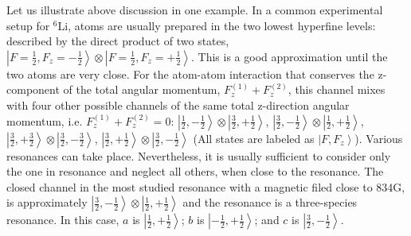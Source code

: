 \documentclass[reprint,pra]{revtex4-1}
\newcommand{\nth}[1]{\ensuremath{\frac{1}{#1}}}
\newcommand{\ket}[1]{\ensuremath{\left|#1\right>}}
\begin{document}
Let us illustrate above discussion in  one example.  In a common experimental setup for $^{6}$Li, atoms are usually  prepared in the two lowest hyperfine levels: described by the  direct product of two states, $\ket{F=\nth{2},F_{z}=-\nth{2}}\otimes\ket{F=\nth{2},F_{z}=+\nth{2}}$.  This is a good approximation until the two atoms are very close.  For the atom-atom interaction that  conserves the z-component of the total angular momentum, $F_{z}^{(1)}+F_{z}^{(2)}$, this channel mixes with four other possible channels of the same total z-direction angular momentum, i.e. $F_{z}^{(1)}+F_{z}^{(2)}=0$: $\ket{\nth{2},-\nth{2}}\otimes\ket{\frac{3}{2},+\nth{2}}$, $\ket{\frac{3}{2},-\nth{2}}\otimes\ket{\nth{2},+\nth{2}}$, $\ket{\frac{3}{2},+\frac{3}{2}}\otimes\ket{\frac{3}{2},-\frac{3}{2}}$, $\ket{\frac{3}{2},+\frac{1}{2}}\otimes\ket{\frac{3}{2},-\frac{1}{2}}$ (All states are labeled as $\ket{F,F_{z}}$).  Various resonances can take place. Nevertheless, it is usually sufficient to consider only the  one in resonance and neglect all others, when close to the resonance.  The closed channel in the most studied resonance with a magnetic filed close to 834G, is approximately $\ket{\frac{3}{2},-\nth{2}}\otimes\ket{\nth{2},+\nth{2}}$ and the resonance is a three-species resonance\cite{ZhangThesis,ChinRMP}. In this case, $a$ is  $\ket{\nth{2},+\nth{2}}$; $b$ is $\ket{-\nth{2},+\nth{2}}$; and $c$ is $\ket{\frac{3}{2},-\nth{2}}$.
\end{document}
